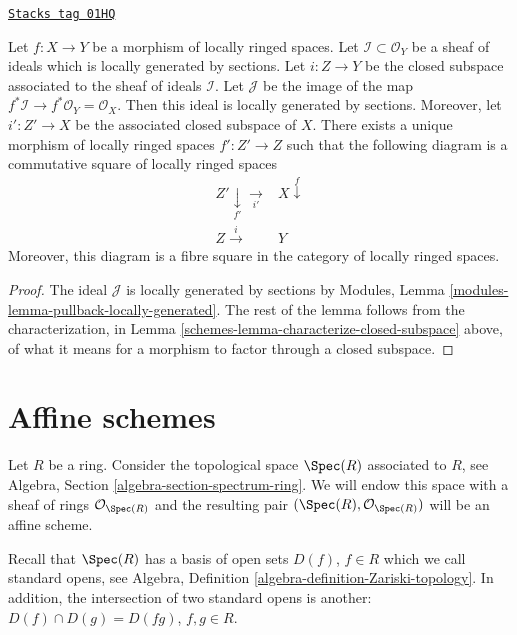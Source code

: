 \begin{lemma}
\label{schemes-lemma-restrict-map-to-closed}
\href{https://stacks.math.columbia.edu/tag/01HQ}{\texttt{Stacks tag 01HQ}}

Let $f : X \to Y$ be a morphism of locally ringed spaces.
Let $\mathcal{I} \subset \mathcal{O}_Y$ be a sheaf of
ideals which is locally generated by sections.
Let $i : Z \to Y$ be the closed subspace associated to the
sheaf of ideals $\mathcal{I}$.
Let $\mathcal{J}$ be the image of the map
$f^*\mathcal{I} \to f^*\mathcal{O}_Y = \mathcal{O}_X$.
Then this ideal is locally generated by sections.
Moreover, let $i' : Z' \to X$ be the associated closed
subspace of $X$. There exists a unique
morphism of locally ringed spaces $f' : Z' \to Z$ such
that the following diagram is a commutative square of
locally ringed spaces
$$
\begin{array}{cc}Z' \underset{f'}{\downarrow}\underset{i'}{\longrightarrow} & X \overset{f}{\downarrow} \\ Z \overset{i}{\longrightarrow} & Y\end{array}
$$
Moreover, this diagram is a fibre square in the category of
locally ringed spaces.
\end{lemma}

\begin{proof}

The ideal $\mathcal{J}$ is locally generated by sections
by Modules, Lemma \ref{modules-lemma-pullback-locally-generated}.
The rest of the lemma follows from the characterization,
in Lemma \ref{schemes-lemma-characterize-closed-subspace} above,
of what it means for a morphism to factor through a closed
subspace.
\end{proof}

\section{Affine schemes}
\label{schemes-section-affine-schemes}
Let $R$ be a ring. Consider the topological space $\Spec(R)$
associated to $R$, see Algebra, Section \ref{algebra-section-spectrum-ring}.
We will endow this space with a sheaf of rings $\mathcal{O}_{\Spec(R)}$
and the resulting pair $(\Spec(R), \mathcal{O}_{\Spec(R)})$
will be an affine scheme.

\medskip\noindent
Recall that $\Spec(R)$ has a basis of open sets $D(f)$,
$f \in R$ which we call standard opens, see Algebra,
Definition \ref{algebra-definition-Zariski-topology}.
In addition, the intersection of two standard opens is another:
$D(f) \cap D(g) = D(fg)$, $f, g\in R$.

